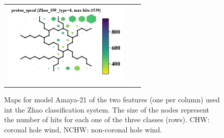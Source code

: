 \documentclass[utf8]{frontiersSCNS} %
\begin{document}
\begin{figure}[h!]
\begin{tabular}{m{1cm}CC}
		\includegraphics[width=6cm]{Amaya/SWtype-Zhao_SW_type-4-proton_speed}\hfill \\
	\end{tabular}
	\caption{Maps for model Amaya-21 of the two features (one per column) used int the Zhao classification system. The size of the nodes represent the number of hits for each one of the three classes (rows). CHW: coronal hole wind, NCHW: non-coronal hole wind.}\label{fig:SWtypeZ}
\end{figure}
\end{document}
